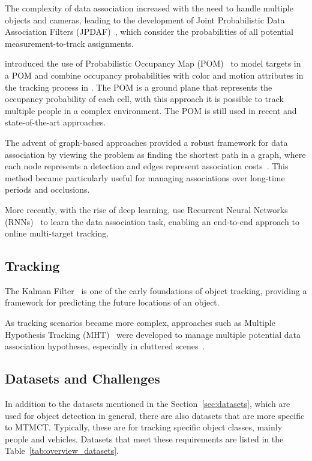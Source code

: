 The complexity of data association increased with the need to handle multiple objects and cameras, leading to the development of Joint Probabilistic Data Association Filters (JPDAF)~\cite{Fortmann83}, which consider the probabilities of all potential measurement-to-track assignments.

\citeauthor{Fleuret08} introduced the use of Probabilistic Occupancy Map (POM)~\cite{Fleuret08} to model targets in a POM and combine occupancy probabilities with color and motion attributes in the tracking process in \citeyear{Fleuret08}. The POM is a ground plane that represents the occupancy probability of each cell, with this approach it is possible to track multiple people in a complex environment. The POM is still used in recent and state-of-the-art approaches.

The advent of graph-based approaches provided a robust framework for data association by viewing the problem as finding the shortest path in a graph, where each node represents a detection and edges represent association costs~\cite{Zhang08}. This method became particularly useful for managing associations over long-time periods and occlusions.

More recently, with the rise of deep learning, \textcite{Milan16b} use Recurrent Neural Networks (RNNs)~\cite{Rumelhart86} to learn the data association task, enabling an end-to-end approach to online multi-target tracking.

\subsection{Tracking}\label{subsec:milestone_tracking}
The Kalman Filter~\cite{Kalman60} is one of the early foundations of object tracking, providing a framework for predicting the future locations of an object.

As tracking scenarios became more complex, approaches such as Multiple Hypothesis Tracking (MHT)~\cite{Blackman04} were developed to manage multiple potential data association hypotheses, especially in cluttered scenes~\cite{Reid79}.

\subsection{Datasets and Challenges}\label{subsec:datasets_and_challenges}
In addition to the datasets mentioned in the Section~\ref{sec:datasets}, which are used for object detection in general, there are also datasets that are more specific to MTMCT. Typically, these are for tracking specific object classes, mainly people and vehicles. Datasets that meet these requirements are listed in the Table~\ref{tab:overview_datasets}.

